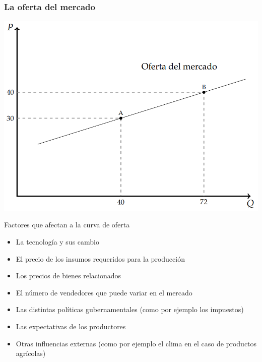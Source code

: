 \documentclass{beamer}
\begin{document}
\begin{frame}
    \frametitle{La oferta del mercado}
    \centering
    \includegraphics[scale=0.6]{../Figures/C14.2.png}
\end{frame}

\begin{frame}{Factores que afectan a la curva de oferta}
    \begin{itemize}
        \item La tecnología y sus cambio
        \item El precio de los insumos requeridos para la producción
        \item Los precios de bienes relacionados
        \item El número de vendedores que puede variar en el mercado
        \item Las distintas políticas gubernamentales (como por ejemplo los impuestos)
        \item Las expectativas de los productores
        \item Otras influencias externas (como por ejemplo el clima en el caso de productos agrícolas)  
    \end{itemize}
\end{frame}
\end{document}
